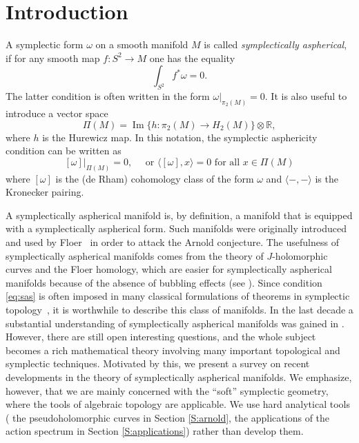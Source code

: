 \documentclass[12pt]{amsart}
\newcommand{\B}[1]{{\mathbb #1}}
\newcommand\R{\B R}
\numberwithin{equation}{section}
\theoremstyle{definition}
\theoremstyle{remark}
\numberwithin{figure}{section}
\numberwithin{table}{section}
\newcommand{\la}{{\lambda}}
\def\Im{\operatorname{Im}}
\def\la{\langle}
\def\ra{\rangle}
\begin{document}
 
 
\section{Introduction}\label{S:intro} 
 
A symplectic form $\omega$ on a smooth manifold $M$ is called {\it  
symplectically  
aspherical}, if for any smooth map $f: S^2\to M$ one has the equality 
% 
\begin{equation}\label{eq:sas} 
\int_{S^2}f^*\omega=0. 
\end{equation} 
% 
The latter condition is often written in the form 
$ 
\omega|_{\pi_2(M)}=0. 
$ 
It is also useful to introduce a vector space  
$$ 
\Pi(M)=\Im\{h: \pi_2(M)\to H_2(M)\}\otimes \R, 
$$  
where $h$ is the Hurewicz map. In this notation, the symplectic asphericity 
condition can be written as 
$$ 
[\omega]|_{\Pi(M)}=0, \quad \text{ or }\la [\omega],x\ra=0 \text{ for all }  
x\in\Pi(M) 
$$ 
where $[\omega]$ is the (de Rham) cohomology class of the form $\omega$ and  
$\la-,-\ra$ is the Kronecker pairing. 
 
A symplectically aspherical manifold is, by definition, a manifold that is  
equipped with 
a symplectically aspherical form.  Such manifolds were originally introduced  
and used  
by Floer~\cite{F} in order to attack the Arnold conjecture. The usefulness of  
symplectically aspherical manifolds comes from the theory of $J$-holomorphic  
curves  
and the Floer  
homology, which are easier for symplectically aspherical manifolds because of  
the  
absence of  
bubbling effects (see \cite{F, H, HZ, MS1, MS2}). Since condition \eqref{eq:sas} 
is  
often  
imposed in many classical formulations of theorems in symplectic  
topology~\cite{LO, O}, 
it is  
worthwhile to describe this class of manifolds. In the last decade a substantial  
understanding of  
symplectically aspherical manifolds was gained in \cite{G1, IKRT, KRT, R2, RO,  
RT1, S}.  
However, there are still open interesting questions, and the whole subject  
becomes a  
rich mathematical theory involving many important topological and symplectic  
techniques.  
Motivated by this, we present a survey on recent developments in the theory of 
symplectically aspherical manifolds. We emphasize, however, that we are 
mainly concerned with the ``soft'' symplectic geometry, where the tools of 
algebraic 
topology are applicable. We use hard analytical tools ( the pseudoholomorphic 
curves  in 
Section \ref{S:arnold}, the applications of the action spectrum in Section 
\ref{S:applications}) rather than develop them. 
 
\end{document}

